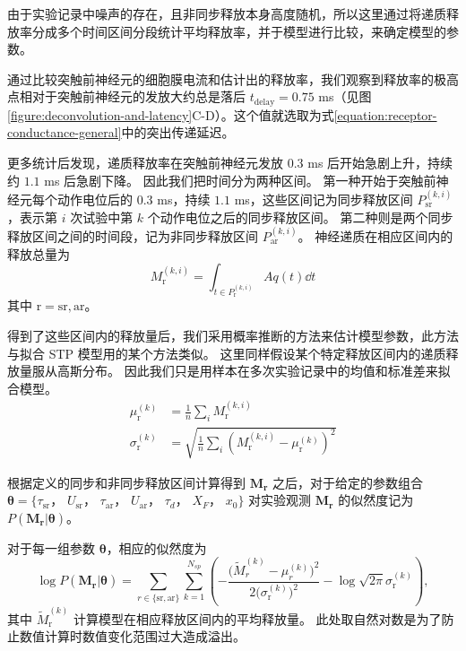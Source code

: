 由于实验记录中噪声的存在，且非同步释放本身高度随机，所以这里通过将递质释放率分成多个时间区间分段统计平均释放率，并于模型进行比较，来确定模型的参数。

通过比较突触前神经元的细胞膜电流和估计出的释放率，我们观察到释放率的极高点相对于突触前神经元的发放大约总是落后 $t_\text{delay} = 0.75$ ms（见图\ref{figure:deconvolution-and-latency}C-D）。这个值就选取为式\ref{equation:receptor-conductance-general}中的突出传递延迟。

更多统计后发现，递质释放率在突触前神经元发放 $0.3$ ms 后开始急剧上升，持续约 $1.1$ ms 后急剧下降。
因此我们把时间分为两种区间。
第一种开始于突触前神经元每个动作电位后的 $0.3$ ms，持续 $1.1$ ms，这些区间记为同步释放区间 $P_\text{sr}^{(k,i)}$ ，表示第 $i$ 次试验中第 $k$ 个动作电位之后的同步释放区间。
第二种则是两个同步释放区间之间的时间段，记为非同步释放区间 $P_\text{ar}^{(k,i)}$。
神经递质在相应区间内的释放总量为
\begin{equation}
M_\text{r}^{(k,i)} = \int_{t \in P_\text{r}^{(k,i)}} Aq(t)\dd{t}
\end{equation}
其中 $\text{r} = \text{sr}, \text{ar}$。

得到了这些区间内的释放量后，我们采用概率推断的方法来估计模型参数，此方法与拟合 STP 模型用的某个方法类似\cite{Costa2013}。
这里同样假设某个特定释放区间内的递质释放量服从高斯分布。
因此我们只是用样本在多次实验记录中的均值和标准差来拟合模型。
\begin{align}
\mu_\text{r}^{(k)} &= \frac{1}{n} \sum_i M_\text{r}^{(k,i)} \\
\sigma_\text{r}^{(k)} &= \sqrt{\frac{1}{n}\sum_i\left( M_\text{r}^{(k,i)} - \mu_\text{r}^{(k)} \right)^2}
\label{equation:statistics-for-fitting}
\end{align}

根据定义的同步和非同步释放区间计算得到 $\bm{M_\text{r}}$ 之后，对于给定的参数组合 $\bm{\theta} = \{\tau_\text{sr}$，
$U_\text{sr}$， $\tau_\text{ar}$， $U_\text{ar}$， $\tau_d$， $X_F$， $x_0 \}$ 对实验观测 $\bm{M_\text{r}}$ 的似然度记为 $P\left(\bm{M_\text{r}}\left|\bm{\theta}\right.\right)$。

对于每一组参数 $\bm{\theta}$，相应的似然度为
\begin{equation}
 \log P\left(\bm{M_\text{r}}\left|\bm{\theta}\right.\right) = \sum_{r \in
    \{\text{sr}, \text{ar}\}}
  \sum_{k=1}^{N_{sp}} \left(-\frac{\big(\tilde{M}_{r}^{(k)}-\mu_{r}^{(k)}\big)^2}{2\big(\sigma_\text{r}^{(k)}\big)^2}
- \log\sqrt{2\pi}\sigma_\text{r}^{(k)} \right),
\label{equation:probabilistic-inference-log}
\end{equation}
其中 $\tilde{M}_\text{r}^{(k)}$ 计算模型在相应释放区间内的平均释放量。
此处取自然对数是为了防止数值计算时数值变化范围过大造成溢出。

